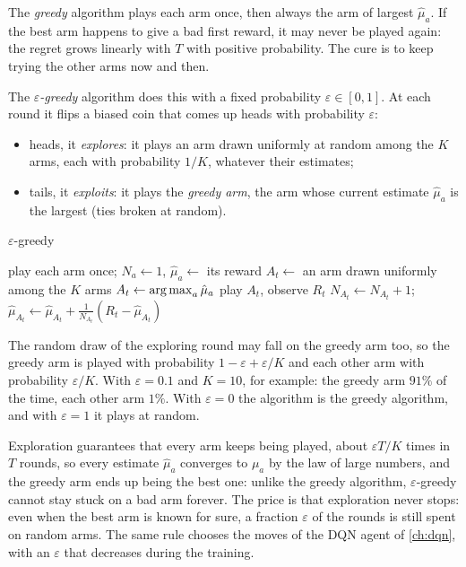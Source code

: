 The \emph{greedy} algorithm plays each arm once, then always the arm of
largest $\hat\mu_a$. If the best arm happens to give a bad first reward, it
may never be played again: the regret grows linearly with $T$ with positive
probability. The cure is to keep trying the other arms now and then.

The \emph{$\varepsilon$-greedy} algorithm does this with a fixed
probability $\varepsilon \in [0, 1]$. At each round it flips a biased coin
that comes up heads with probability $\varepsilon$:
\begin{itemize}[nosep]
  \item heads, it \emph{explores}: it plays an arm drawn uniformly at random
    among the $K$ arms, each with probability $1/K$, whatever their
    estimates;
  \item tails, it \emph{exploits}: it plays the \emph{greedy arm}, the arm
    whose current estimate $\hat\mu_a$ is the largest (ties broken at
    random).
\end{itemize}

\begin{algobox}{$\varepsilon$-greedy}
  \begin{algorithmic}[1]
    \State play each arm once; $N_a \gets 1$, $\hat\mu_a \gets$ its reward
        \State $A_t \gets$ an arm drawn uniformly among the $K$ arms
      \Else
        \State $A_t \gets \operatorname*{arg\,max}_a \hat\mu_a$
      \EndIf
      \State play $A_t$, observe $R_t$
      \State $N_{A_t} \gets N_{A_t} + 1$;\quad $\hat\mu_{A_t} \gets
        \hat\mu_{A_t} + \frac{1}{N_{A_t}} (R_t - \hat\mu_{A_t})$
    \EndFor
  \end{algorithmic}
\end{algobox}

The random draw of the exploring round may fall on the greedy arm too, so
the greedy arm is played with probability $1 - \varepsilon + \varepsilon /
K$ and each other arm with probability $\varepsilon / K$. With $\varepsilon
= 0.1$ and $K = 10$, for example: the greedy arm $91\%$ of the time, each
other arm $1\%$. With $\varepsilon = 0$ the algorithm is the greedy
algorithm, and with $\varepsilon = 1$ it plays at random.

\begin{intuition}
  Exploration guarantees that every arm keeps being played, about
  $\varepsilon T / K$ times in $T$ rounds, so every estimate $\hat\mu_a$
  converges to $\mu_a$ by the law of large numbers, and the greedy arm ends
  up being the best one: unlike the greedy algorithm, $\varepsilon$-greedy
  cannot stay stuck on a bad arm forever. The price is that exploration
  never stops: even when the best arm is known for sure, a fraction
  $\varepsilon$ of the rounds is still spent on random arms. The same rule
  chooses the moves of the DQN agent of \cref{ch:dqn}, with an
  $\varepsilon$ that decreases during the training.
\end{intuition}

